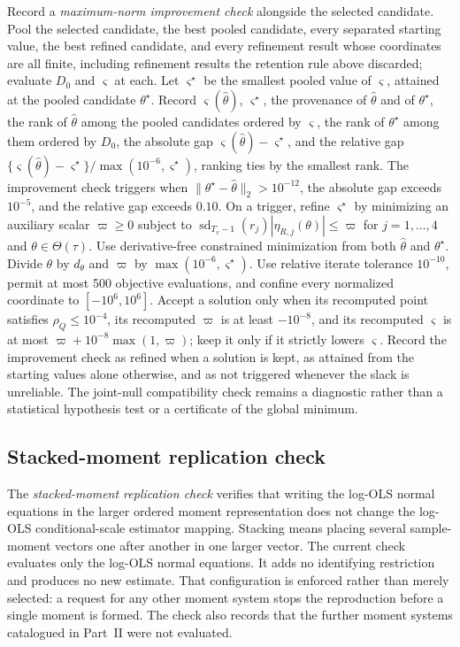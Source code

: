 \documentclass[11pt]{article}
\begin{document}
Record a \emph{maximum-norm improvement check} alongside the selected candidate. Pool the selected
candidate, the best pooled candidate, every separated starting value, the best refined candidate, and
every refinement result whose coordinates are all finite, including refinement results the retention
rule above discarded; evaluate \(D_0\) and \(\varsigma\) at each. Let
\(\varsigma^\star\) be the smallest pooled value of \(\varsigma\), attained at the pooled candidate
\(\theta^\star\). Record \(\varsigma(\widehat\theta)\), \(\varsigma^\star\), the provenance of
\(\widehat\theta\) and of \(\theta^\star\), the rank of \(\widehat\theta\) among the pooled candidates
ordered by \(\varsigma\), the rank of \(\theta^\star\) among them ordered by \(D_0\), the absolute gap
\(\varsigma(\widehat\theta)-\varsigma^\star\), and the relative gap
\(\{\varsigma(\widehat\theta)-\varsigma^\star\}/\max(10^{-6},\varsigma^\star)\), ranking ties by the
smallest rank. The improvement check triggers when \(\|\theta^\star-\widehat\theta\|_2>10^{-12}\), the
absolute gap exceeds \(10^{-5}\), and the relative gap exceeds \(0.10\). On a trigger, refine
\(\varsigma^\star\) by minimizing an auxiliary scalar \(\varpi\ge0\) subject to
\(\operatorname{sd}_{T_v-1}(r_j)|\eta_{R,j}(\theta)|\le\varpi\) for \(j=1,\ldots,4\) and
\(\theta\in\Theta(\tau)\). Use derivative-free constrained minimization from both \(\widehat\theta\)
and \(\theta^\star\). Divide \(\theta\) by \(d_\theta\) and \(\varpi\) by
\(\max(10^{-6},\varsigma^\star)\). Use relative iterate tolerance \(10^{-10}\), permit at most 500
objective evaluations, and confine every normalized coordinate to \([-10^{6},10^{6}]\). Accept a
solution only when its recomputed point satisfies \(\rho_Q\le10^{-4}\), its recomputed \(\varpi\) is
at least \(-10^{-8}\), and its recomputed \(\varsigma\) is at most
\(\varpi+10^{-8}\max(1,\varpi)\); keep it only if it strictly lowers \(\varsigma\). Record the
improvement check as refined when a solution is kept, as attained from the starting values alone otherwise,
and as not triggered whenever the slack is unreliable. The joint-null compatibility check remains a
diagnostic rather than a statistical hypothesis test or a certificate of the global minimum.

\subsection{Stacked-moment replication check}

The \emph{stacked-moment replication check} verifies that writing the log-OLS normal equations in
the larger ordered moment representation does not change the log-OLS conditional-scale estimator
mapping. Stacking means placing several sample-moment vectors one after another in one larger vector.
The current check evaluates only the log-OLS normal equations. It adds no identifying restriction and
produces no new estimate. That configuration is enforced rather than merely selected: a request for
any other moment system stops the reproduction before a single moment is formed. The check also
records that the further moment systems catalogued in Part~II were not evaluated.
\end{document}
